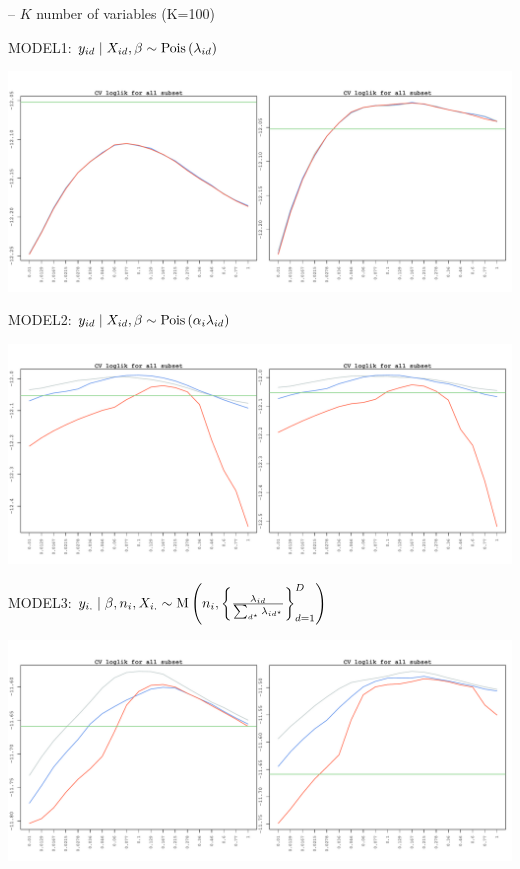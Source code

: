 \documentclass[12pt, letter]{article}
\begin{document}
   -- $K$ number of variables (K=100)

\newpage
MODEL1: $y_{id}\mid X_{id}, \beta \sim \mathrm{Pois}\zag{\lambda_{id}}$

\includegraphics[width=6.5in]{basic.pdf}

 
\newpage
MODEL2: $y_{id}\mid X_{id}, \beta \sim \mathrm{Pois}\zag{\alpha_{i}\lambda_{id}}$

\includegraphics[width=6.5in]{basicMKT.pdf}



\newpage
MODEL3: $y_{i.}\mid \beta, n_i,  X_{i.}\sim \mathrm{M}
    \zag{n_i, \zagv{\frac{\lambda_{id}}{\sum_{d^\star}\lambda_{id^\star}}}_{d=1}^D}$

\includegraphics[width=6.5in]{MULT.pdf}
\end{document}
